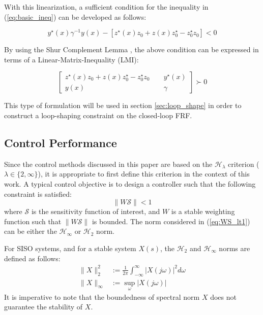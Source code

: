 \documentclass[a4paper, 10pt, conference]{ieeeconf}
\begin{document}
With this linearization, a sufficient condition for the inequality in (\ref{eq:basic_ineq}) can be developed as follows:

\begin{equation}
y^{\star}(x) \gamma^{-1} y(x) - [z^{\star}(x)z_0 + z(x)z_0^{\star} - z_0^{\star}z_0]< 0 
\end{equation}

By using the Shur Complement Lemma \cite{BEN09}, the above condition can be expressed in terms of a Linear-Matrix-Inequality (LMI):

\begin{equation} \label{eq:LMI_1}
\begin{bmatrix}
z^{\star}(x)z_0 + z(x)z_0^{\star} - z_0^{\star}z_0 & \phantom{xx} y^{\star}(x) \\
y(x) & \phantom{xx} \gamma
\end{bmatrix}
\succ 0
\end{equation}

This type of formulation will be used in section \ref{sec:loop_shape} in order to construct a loop-shaping constraint on the closed-loop FRF.

\subsection{Control Performance}
Since the control methods discussed in this paper are based on the $\mathcal{H}_\lambda$ criterion ($\lambda \in \{2,\infty \}$), it is appropriate to first define this criterion in the context of this work. A typical control objective is to design a controller such that the following constraint is satisfied:
\begin{equation} \label{eq:WS_lt1}
\| W \mathcal{S}\| < 1
\end{equation}
where $\mathcal{S}$ is the sensitivity function of interest, and $W$ is a stable weighting function such that $\| W \mathcal{S}\|$ is bounded. The norm considered in (\ref{eq:WS_lt1}) can be either the $\mathcal{H}_\infty$ or $\mathcal{H}_2$ norm. 

For SISO systems, and for a stable system $X(s)$, the $\mathcal{H}_2$ and $\mathcal{H}_\infty$ norms are defined as follows:
\begin{align*}
\| X\|_2^2 & := \frac{1}{2\pi} \int_{- \infty}^\infty |X(j\omega)|^2 d\omega \\
\| X\|_\infty & :=  \sup_{\omega} |X(j\omega)|
\end{align*}
It is imperative to note that the boundedness of spectral norm $X$ does not guarantee the stability of $X$. 
\end{document}

